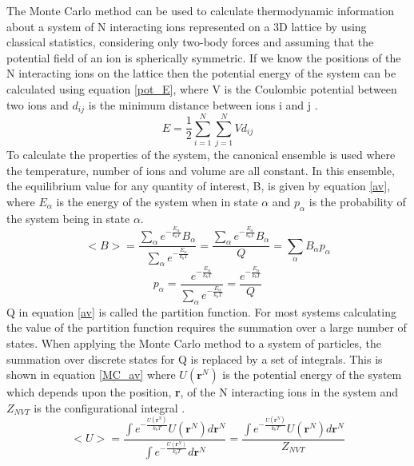 The Monte Carlo method can be used to calculate thermodynamic information about a system of N interacting ions represented on a 3D lattice by using classical statistics, considering only two-body forces and assuming that the potential field of an ion is spherically symmetric. If we know the positions of the N interacting ions on the lattice then the potential energy of the system can be calculated using equation \ref{pot_E}, where V is the Coulombic potential between two ions and $d_{ij}$ is the minimum distance between ions i and j \cite{Metropolis}.
\begin{equation}\label{pot_E}
E = \frac{1}{2} \sum_{i=1}^N \sum_{j=1}^N V d_{ij}
\end{equation}
To calculate the properties of the system, the canonical ensemble is used where the temperature, number of ions and volume are all constant. In this ensemble, the equilibrium value for any quantity of interest, B, is given by equation \ref{av}, where $E_\alpha$ is the energy of the system when in state $\alpha$ and $p_\alpha$ is the probability of the system being in state $\alpha$.
\begin{equation}\label{av}
<B> = \frac{ \sum_\alpha e^{-\frac{E_\alpha}{k_bT}} B_\alpha}{ \sum_\alpha e^{-\frac{E_\alpha}{k_bT}}} = \frac{ \sum_\alpha e^{-\frac{E_\alpha}{k_bT}} B_\alpha}{Q} = \sum_\alpha B_\alpha p_\alpha
\end{equation}
\begin{equation}\label{prob}
p_\alpha = \frac{  e^{-\frac{E_\alpha}{k_bT}} }{ \sum_{\alpha} e^{-\frac{E_\alpha}{k_bT}}} =\frac{  e^{-\frac{E_\alpha}{k_bT}} }{Q}
\end{equation}
Q in equation \ref{av} is called the partition function. For most systems calculating the value of the partition function requires the summation over a large number of states. When applying the Monte Carlo method to a system of particles, the summation over discrete states for Q is replaced by a set of integrals. This is shown in equation \ref{MC_av} where $U(\mathbf{r}^N)$ is the potential energy of the system which depends upon the position, \textbf{r}, of the N interacting ions in the system and $Z_{NVT}$ is the configurational integral \cite{Lesar3}.
\begin{equation}\label{MC_av}
<U> = \frac{ \int e^{-\frac{U(\mathbf{r}^N)}{k_bT}} U(\mathbf{r}^N) d\mathbf{r}^N}{\int e^{-\frac{U(\mathbf{r}^N)}{k_bT}} d\mathbf{r}^N}  = \frac{  \int e^{-\frac{U(\mathbf{r}^N)}{k_bT}} U(\mathbf{r}^N) d\mathbf{r}^N}{Z_{NVT}} 
\end{equation}
